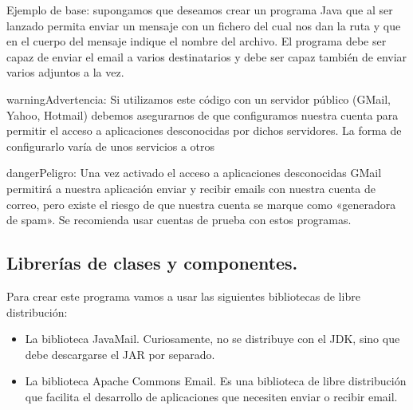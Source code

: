 \documentclass[letterpaper,10pt,spanish]{sphinxmanual}
\begin{document}
Ejemplo de base: supongamos que deseamos crear un programa Java que al ser lanzado permita enviar un mensaje con un fichero del cual nos dan la ruta y que en el cuerpo del mensaje indique el nombre del archivo. El programa debe ser capaz de enviar el email a varios destinatarios y debe ser capaz también de enviar varios adjuntos a la vez.

\begin{sphinxadmonition}{warning}{Advertencia:}
Si utilizamos este código con un servidor público (GMail, Yahoo, Hotmail) debemos asegurarnos de que configuramos nuestra cuenta para permitir el acceso a aplicaciones desconocidas por dichos servidores. La forma de configurarlo varía de unos servicios a otros
\end{sphinxadmonition}

\begin{sphinxadmonition}{danger}{Peligro:}
Una vez activado el acceso a aplicaciones desconocidas GMail permitirá a nuestra aplicación enviar y recibir emails con nuestra cuenta de correo, pero existe el riesgo de que nuestra cuenta se marque como «generadora de spam». Se recomienda usar cuentas de prueba con estos programas.
\end{sphinxadmonition}


\subsection{Librerías de clases y componentes.}
\label{\detokenize{textos/tema4:librerias-de-clases-y-componentes}}
Para crear este programa vamos a usar las siguientes bibliotecas de libre distribución:
\begin{itemize}
\item {} 
La biblioteca JavaMail. Curiosamente, no se distribuye con el JDK, sino que debe descargarse el JAR por separado.

\item {} 
La biblioteca Apache Commons Email. Es una biblioteca de libre distribución que facilita el desarrollo de aplicaciones que necesiten enviar o recibir email.

\end{itemize}
\end{document}
